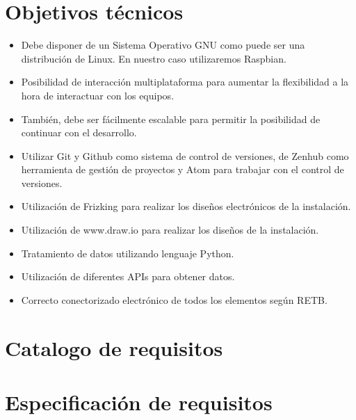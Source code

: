             \section{Objetivos técnicos}
            \begin{itemize}
                
                \item Debe disponer de un Sistema Operativo GNU como puede ser una distribución de Linux. En nuestro caso utilizaremos Raspbian.
                \item Posibilidad de interacción multiplataforma para aumentar la flexibilidad a la hora de interactuar con los equipos.
                \item También, debe ser fácilmente escalable para permitir la posibilidad de continuar con el desarrollo.
                
                \item Utilizar Git y Github como sistema de control de versiones, de Zenhub como herramienta de gestión de proyectos y Atom para trabajar con el control de versiones.
                \item Utilización de Frizking para realizar los diseños electrónicos de la instalación.
                \item Utilización de www.draw.io para realizar los diseños de la instalación.
                \item Tratamiento de datos utilizando lenguaje Python.
                \item Utilización de diferentes APIs para obtener datos.
                \item Correcto conectorizado electrónico de todos los elementos según RETB.
            \end{itemize}





\section{Catalogo de requisitos}

\section{Especificación de requisitos}


